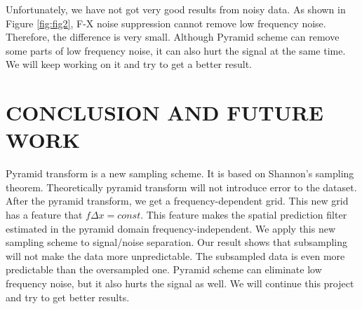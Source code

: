 \par
Unfortunately, we have not got very good results from noisy data. As shown in 
Figure \ref{fig:fig2}, F-X noise suppression cannot remove low frequency noise. 
Therefore, the difference is very small. Although Pyramid scheme can remove 
some parts of low frequency noise, it can also hurt the signal at the same 
time. We will keep working on it and try to get a better result.




\section{CONCLUSION AND FUTURE WORK}
\par
Pyramid transform is a new sampling scheme. It is based on Shannon's sampling 
theorem. Theoretically pyramid transform will not introduce error to the 
dataset. After the pyramid transform, we get a frequency-dependent grid. This
 new grid has a feature that $f\Delta x = const$. This feature 
makes the spatial prediction filter estimated in the pyramid domain 
frequency-independent. We apply this new sampling scheme to signal/noise 
separation. Our result shows that subsampling will not make the data more 
unpredictable. The subsampled data is even more predictable than the 
oversampled one. Pyramid scheme can eliminate low frequency noise, but it 
also hurts the signal as well. We will continue this project and try to get 
better results.
  




